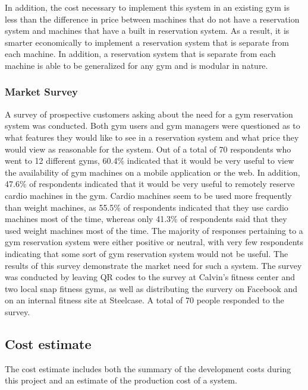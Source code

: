 \documentclass[PPFS.tex]{template/subfiles}
\begin{document}
        In addition, the cost necessary to implement this system in an existing gym is less than the difference in price between machines that do not have a reservation system and machines that have a built in reservation system. As a result, it is smarter economically to implement a reservation system that is separate from each machine. In addition, a reservation system that is separate from each machine is able to be generalized for any gym and is modular in nature.%
        
        \subsubsection{Market Survey}
        
        A survey of prospective customers asking about the need for a gym reservation system was conducted. Both gym users and gym managers were questioned as to what features they would like to see in a reservation system and what price they would view as reasonable for the system. Out of a total of 70 respondents who went to 12 different gyms, 60.4\% indicated that it would be very useful to view the availability of gym machines on a mobile application or the web. In addition, 47.6\% of respondents indicated that it would be very useful to remotely reserve cardio machines in the gym. Cardio machines seem to be used more frequently than weight machines, as 55.5\% of respondents indicated that they use cardio machines most of the time, whereas only 41.3\% of respondents said that they used weight machines most of the time. The majority of responses pertaining to a gym reservation system were either positive or neutral, with very few respondents indicating that some sort of gym reservation system would not be useful. The results of this survey demonstrate the market need for such a system. The survey was conducted by leaving QR codes to the survey at Calvin's fitness center and two local snap fitness gyms, as well as distributing the survery on Facebook and on an internal fitness site at Steelcase. A total of 70 people responded to the survey.
        
        
    \subsection{Cost estimate}
    The cost estimate includes both the summary of the development costs during this project and an estimate of the production cost of a system.
    
\end{document}
